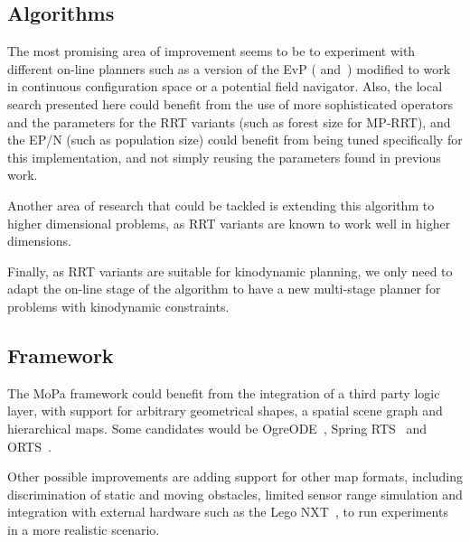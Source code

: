\subsection{Algorithms}
The most promising area of improvement seems to be to experiment with different on-line planners
such as a version of the
EvP (\cite{Alfaro05} and~\cite{Alfaro08}) modified to work in
continuous configuration space or a potential field navigator. Also, the local
search presented here could benefit from the use of more sophisticated
operators and the parameters for the RRT variants (such as forest size for
MP-RRT),
and the EP/N (such as population size) could benefit from being tuned specifically for this
implementation, and not simply reusing the parameters found in previous work.

Another area of research that could be tackled is extending this algorithm to
higher dimensional problems, as RRT variants
are known to work well in higher dimensions.

Finally, as RRT variants are suitable for kinodynamic planning, we only need to adapt
the on-line stage of the algorithm to have a new multi-stage planner for problems
with kinodynamic constraints.
\subsection{Framework}
The MoPa framework could benefit from the integration of a third party logic
layer, with support for arbitrary geometrical shapes, a spatial scene graph and
hierarchical maps. Some candidates would be
OgreODE~\cite{OgreODE}, Spring
RTS~\cite{SpringRTS} and
ORTS~\cite{ORTS}.

Other possible improvements are adding support for other map formats, including
discrimination of static and moving obstacles, limited
sensor range simulation and integration with external hardware such as the Lego
NXT~\cite{LegoNXT}, to run experiments in a more
realistic scenario.
